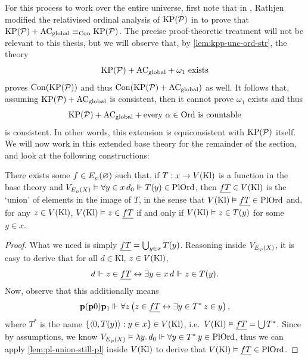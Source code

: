 \documentclass[12pt,openany]{book}
\theoremstyle{plain}
\theoremstyle{definition}
\newcommand\tuple[1]{\left\langle #1 \right\rangle}
\newcommand\opA[1]{\mathop{\forall #1}}
\newcommand\opE[1]{\mathop{\exists #1}}
\newcommand\oplam[1]{\mathop{\lambda #1.}}
\DeclareMathOperator\Con{Con}
\newcommand\Pow{\mathcal{P}}
\newcommand\KPP{\mathrm{KP}\mleft(\Pow\mright)}
\newcommand\ACg{\mathrm{AC}_\text{global}}
\newcommand\Ord{\mathrm{Ord}}
\newcommand\PlOrd{\mathrm{PlOrd}}
\newcommand\Kl{\mathrm{Kl}}
\newcommand\bp{\mathbf{p}}
\begin{document}
For this process to work over the entire universe, first note that in \cite{rathjen20-power-kp-choice}, Rathjen modified the relativised ordinal analysis of $\KPP$ in \cite{rathjen14-power-kp} to prove that $\KPP + \ACg \equiv_{\Con} \KPP$. The precise proof-theoretic treatment will not be relevant to this thesis, but we will observe that, by \autoref{lem:kpp-unc-ord-str}, the theory
\[\KPP + \ACg + \text{$\omega_1$ exists}\]
proves $\Con\mleft(\KPP\mright)$ and thus $\Con\mleft(\KPP + \ACg\mright)$ as well. It follows that, assuming $\KPP + \ACg$ is consistent, then it cannot prove $\omega_1$ exists and thus
\[\KPP + \ACg + \text{every $\alpha \in \Ord$ is countable}\]
is consistent. In other words, this extension is equiconsistent with $\KPP$ itself. We will now work in this extended base theory for the remainder of the section, and look at the following constructions:
\begin{lemma}
  \label{lem:kpp-union-real-pl}
  There exists some $f \in E_\wp\mleft(\varnothing\mright)$ such that, if $T : x \rightarrow V\mleft(\Kl\mright)$ is a function in the base theory and $V_{E_\wp\mleft(X\mright)} \vDash \opA{y \in x} d_0 \Vdash T\mleft(y\mright) \in \PlOrd$, then $\underline{fT} \in V\mleft(\Kl\mright)$ is the `union' of elements in the image of $T$, in the sense that $V\mleft(\Kl\mright) \vDash \underline{fT} \in \PlOrd$ and, for any $z \in V\mleft(\Kl\mright)$, $V\mleft(\Kl\mright) \vDash z \in \underline{fT}$ if and only if $V\mleft(\Kl\mright) \vDash z \in T\mleft(y\mright)$ for some $y \in x$.
\end{lemma}

\begin{proof}
  What we need is simply $\underline{fT} = \bigcup_{y \in x} T\mleft(y\mright)$. Reasoning inside $V_{E_\wp\mleft(X\mright)}$, it is easy to derive that for all $d \in \Kl$, $z \in V\mleft(\Kl\mright)$,
  \[d \Vdash z \in \underline{fT} \leftrightarrow \opE{y \in x} d \Vdash z \in T\mleft(y\mright).\]
  Now, observe that this additionally means
  \[\bp \mleft(\bp 0\mright) \bp_1 \Vdash \opA{z} \left(z \in \underline{fT} \leftrightarrow \opE{y \in T^*} z \in y\right),\]
  where $T^*$ is the name $\left\{\tuple{0, T\mleft(y\mright)} : y \in x\right\} \in V\mleft(\Kl\mright)$, i.e.\ $V\mleft(\Kl\mright) \vDash \underline{fT} = \bigcup T^*$. Since by assumptions, we know $V_{E_\wp\mleft(X\mright)} \vDash \oplam{y} d_0 \Vdash \opA{y \in T^*} y \in \PlOrd$, thus we can apply \autoref{lem:pl-union-still-pl} inside $V\mleft(\Kl\mright)$ to derive that $V\mleft(\Kl\mright) \vDash \underline{fT} \in \PlOrd$.
\end{proof}
\end{document}
